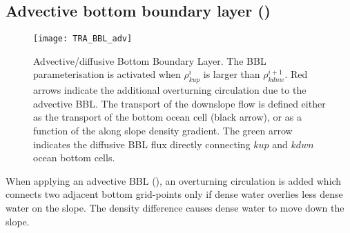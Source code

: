 \documentclass[../main/NEMO_manual]{subfiles}
\begin{document}
\subsection[Advective bottom boundary layer (\forcode{nn_bbl_adv=1,2})]{Advective bottom boundary layer (\protect{})}
\label{subsec:TRA_bbl_adv}


\begin{figure}
  \centering
  \texttt{[image: TRA\_BBL\_adv]}
  \caption[Advective/diffusive bottom boundary layer]{
    Advective/diffusive Bottom Boundary Layer.
    The BBL parameterisation is activated when $\rho^i_{kup}$ is larger than $\rho^{i + 1}_{kdnw}$.
    Red arrows indicate the additional overturning circulation due to the advective BBL.
    The transport of the downslope flow is defined either
    as the transport of the bottom ocean cell (black arrow),
    or as a function of the along slope density gradient.
    The green arrow indicates the diffusive BBL flux directly connecting
    $kup$ and $kdwn$ ocean bottom cells.}
  \label{fig:TRA_bbl}
\end{figure}



When applying an advective BBL (),
an overturning circulation is added which connects two adjacent bottom grid-points only if
dense water overlies less dense water on the slope.
The density difference causes dense water to move down the slope.
\end{document}
